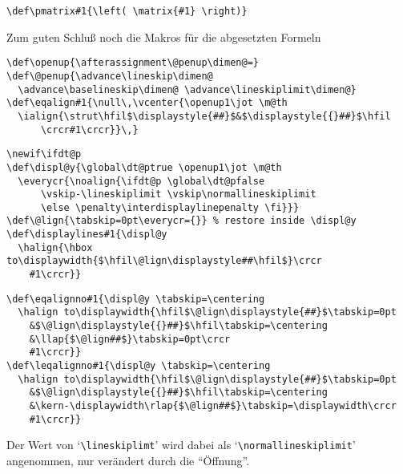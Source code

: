 \begin{appendix}
\begin{verbatim}
\def\pmatrix#1{\left( \matrix{#1} \right)}
\end{verbatim}
Zum guten Schlu\ss{} noch die Makros f\"ur die 
abgesetzten Formeln
\begin{verbatim}
\def\openup{\afterassignment\@penup\dimen@=}
\def\@penup{\advance\lineskip\dimen@
  \advance\baselineskip\dimen@ \advance\lineskiplimit\dimen@}
\def\eqalign#1{\null\,\vcenter{\openup1\jot \m@th
  \ialign{\strut\hfil$\displaystyle{##}$&$\displaystyle{{}##}$\hfil
      \crcr#1\crcr}}\,}
\end{verbatim}
\begin{verbatim}
\newif\ifdt@p
\def\displ@y{\global\dt@ptrue \openup1\jot \m@th
  \everycr{\noalign{\ifdt@p \global\dt@pfalse
      \vskip-\lineskiplimit \vskip\normallineskiplimit
      \else \penalty\interdisplaylinepenalty \fi}}}
\def\@lign{\tabskip=0pt\everycr={}} % restore inside \displ@y
\def\displaylines#1{\displ@y
  \halign{\hbox to\displaywidth{$\hfil\@lign\displaystyle##\hfil$}\crcr
    #1\crcr}}
\end{verbatim}
\begin{verbatim}
\def\eqalignno#1{\displ@y \tabskip=\centering
  \halign to\displaywidth{\hfil$\@lign\displaystyle{##}$\tabskip=0pt
    &$\@lign\displaystyle{{}##}$\hfil\tabskip=\centering
    &\llap{$\@lign##$}\tabskip=0pt\crcr
    #1\crcr}}
\def\leqalignno#1{\displ@y \tabskip=\centering
  \halign to\displaywidth{\hfil$\@lign\displaystyle{##}$\tabskip=0pt
    &$\@lign\displaystyle{{}##}$\hfil\tabskip=\centering
    &\kern-\displaywidth\rlap{$\@lign##$}\tabskip=\displaywidth\crcr
    #1\crcr}}
\end{verbatim}
Der Wert von `\verb|\lineskiplimt|' wird dabei als
`\verb|\normallineskiplimit|' angenommen, nur ver\"an\-dert durch die
``\"Offnung''.


\end{appendix}
